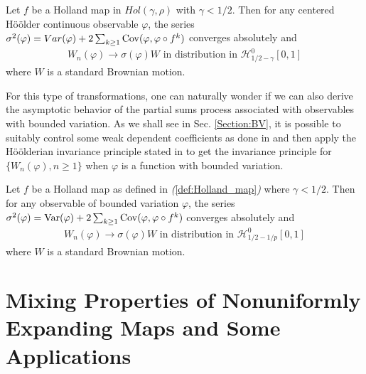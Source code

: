 \documentclass{ws-sd}
\begin{document}
\begin{corollary}
    Let $f$ be a Holland map in $Hol(\gamma, \rho)$ with $\gamma < 1/2$. Then for any centered Hö\"older continuous observable $\varphi$, the series $\sigma^2(\varphi) = Var(\varphi) + 2\sum_{k \ge 1} {\rm Cov}(\varphi, \varphi \circ f^k)$ converges absolutely and
    \begin{align*}
        W_n(\varphi) \to \sigma(\varphi)W \text{ in distribution in } \mathcal H _{1/2-\gamma}^0 [0,1]
    \end{align*}
    where $W$ is a standard Brownian motion.
\end{corollary}

For this type of transformations, one can naturally wonder if we can also derive the asymptotic behavior of the partial sums process associated with observables with bounded variation. As we shall see in Sec. \ref{Section:BV}, it is possible to suitably control some weak dependent coefficients as done in \cite{7} and then apply the H\"oölderian invariance principle stated in \cite{9} to get the invariance principle for $\{W_n(\varphi), n \ge 1\}$ when $\varphi$ is a function with bounded variation.
\begin{theorem}\label{hip_BV}
    Let $f$ be a Holland map as defined in {\em (}\ref{def:Holland_map}{\em )} where $\gamma < 1/2$.
    Then for any observable of bounded variation $\varphi$, the series $\sigma^2(\varphi) = {\rm Var}(\varphi) + 2\sum_{k \ge 1} {\rm Cov}(\varphi, \varphi \circ f^k)$ converges absolutely and
     \begin{align*}
        W_n(\varphi) \to \sigma(\varphi)W \text{ in distribution in } \mathcal{H}_{1/2 - 1/p}^0[0,1]
    \end{align*}
    where $W$ is a standard Brownian motion.
\end{theorem}

        \section{Mixing Properties of Nonuniformly Expanding Maps and Some Applications} \label{Section:HIP}
\end{document}
